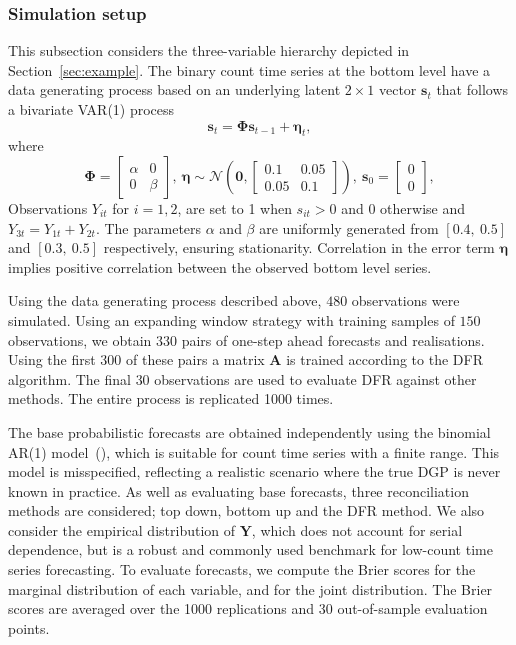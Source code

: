 \documentclass[a4paper,review,12pt,authoryear]{elsarticle}
\theoremstyle{definition}
\begin{document}
    \subsubsection{Simulation setup}
    This subsection considers the three-variable hierarchy depicted in Section~\ref{sec:example}. The binary count time series at the bottom level have a data generating process based on an underlying latent $2\times 1$ vector $\mathbf{s}_t$ that follows a bivariate VAR(1) process
    \[\mathbf{s}_t = \mathbf{\Phi}\mathbf{s}_{t-1}+\boldsymbol{\eta}_t,\]
    where
    \[
      \mathbf{\Phi} = \left[\begin{matrix}
        \alpha & 0 \\
        0 & \beta
      \end{matrix}\right], ~ \boldsymbol{\eta} \sim \mathcal{N}\left(\mathbf{0}, \left[\begin{matrix}
        0.1 & 0.05 \\
        0.05 & 0.1
      \end{matrix}\right]\right), ~ \mathbf{s}_{0} = \left[
        \begin{matrix}0 \\ 0\end{matrix}
      \right],
    \]
    Observations $Y_{it}$ for $i=1,2$, are set to 1 when $s_{it}>0$ and 0 otherwise and $Y_{3t}=Y_{1t}+Y_{2t}$. The parameters $\alpha$ and $\beta$ are uniformly generated from $[0.4, ~ 0.5]$ and $[0.3, ~ 0.5]$ respectively, ensuring stationarity. Correlation in the error term $\boldsymbol{\eta}$ implies positive correlation between the observed bottom level series.

   
    Using the data generating process described above, $480$ observations were simulated. Using an expanding window strategy with training samples of $150$ observations, we obtain $330$ pairs of one-step ahead forecasts and realisations. Using the first $300$ of these pairs a matrix $\mathbf{A}$ is trained according to the DFR algorithm. The final $30$ observations are used to evaluate DFR against other methods. The entire process is replicated 1000 times.
    

    The base probabilistic forecasts are obtained independently using the binomial AR(1) model~(\citealp{weissParameterEstimationBinomial2013}), which is suitable for count time series with a finite range. This model is misspecified, reflecting a realistic scenario where the true DGP is never known in practice. As well as evaluating base forecasts, three reconciliation methods are considered; top down, bottom up and the DFR method. We also consider the empirical distribution of $\mathbf{Y}$, which does not account for serial dependence, but is a robust and commonly used benchmark for low-count time series forecasting. To evaluate forecasts, we compute the Brier scores for the marginal distribution of each variable, and for the joint distribution. The Brier scores are averaged over the 1000 replications and 30 out-of-sample evaluation points.
\end{document}
